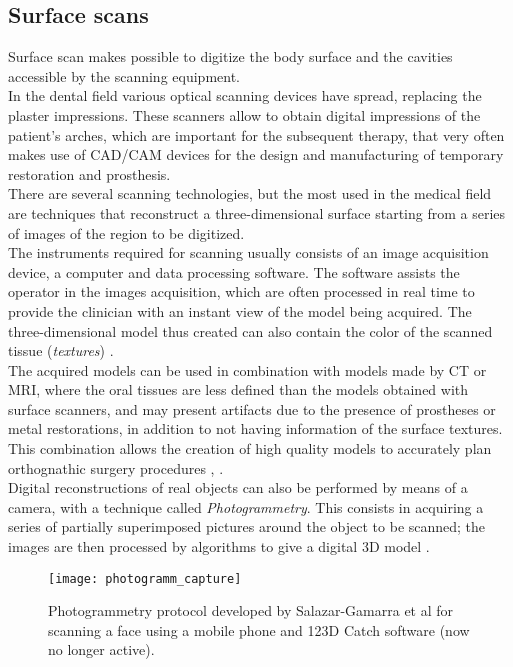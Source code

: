 \subsection{Surface scans}
Surface scan makes possible to digitize the body surface and the cavities accessible by the scanning equipment.\\
In the dental field various optical scanning devices have spread, replacing the plaster impressions. These scanners allow to obtain digital impressions of the patient's arches, which are important for the subsequent therapy, that very often makes use of CAD/CAM devices for the design and manufacturing of temporary restoration and prosthesis.\\
There are several scanning technologies, but the most used in the medical field are techniques that reconstruct a three-dimensional surface starting from a series of images of the region to be digitized.\\
The instruments required for scanning usually consists of an image acquisition device, a computer and data processing software. The software assists the operator in the images acquisition, which are often processed in real time to provide the clinician with an instant view of the model being acquired. The three-dimensional model thus created can also contain the color of the scanned tissue (\emph{textures}) \parencite{Reference20}. \\
The acquired models can be used in combination with models made by CT or MRI, where the oral tissues are less defined than the models obtained with surface scanners, and may present artifacts due to the presence of prostheses or metal restorations, in addition to not having information of the surface textures. This combination allows the creation of high quality models to accurately plan orthognathic surgery procedures \parencite{Reference21}, \parencite{Reference22}. \\
Digital reconstructions of real objects can also be performed by means of a camera, with a technique called \emph{Photogrammetry}. This consists in acquiring a series of partially superimposed pictures around the object to be scanned; the images are then processed by algorithms to give a digital 3D model \parencite{Reference117}. \newpage
\begin{figure}[h]
\vspace{-10pt}
    \centering
    \texttt{[image: photogramm\_capture]}
    \caption{Photogrammetry protocol developed by Salazar-Gamarra et al \parencite{Reference117} for scanning a face using a mobile phone and 123D Catch software (now no longer active).}
    \label{fig:photogramm_capture}
\end{figure}

